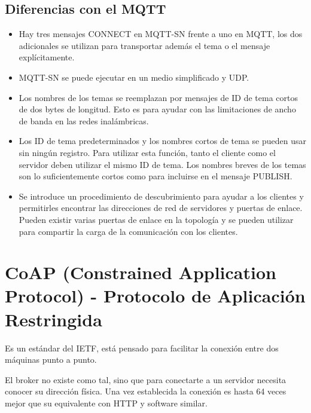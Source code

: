 \documentclass[12pt, twoside, openright]{report} %
\begin{document}
\subsection{Diferencias con el MQTT}
\begin{itemize}
	\item Hay tres mensajes CONNECT en MQTT-SN frente a uno en MQTT, los dos adicionales se utilizan para transportar además el tema o el mensaje explícitamente.
	\item MQTT-SN se puede ejecutar en un medio simplificado y UDP.
	\item Los nombres de los temas se reemplazan por mensajes de ID de tema cortos de dos bytes de longitud. Esto es para ayudar con las limitaciones de ancho de banda en las redes inalámbricas.
	\item Los ID de tema predeterminados y los nombres cortos de tema se pueden usar sin ningún registro. Para utilizar esta función, tanto el cliente como el servidor deben utilizar el mismo ID de tema. Los nombres breves de los temas son lo suficientemente cortos como para incluirse en el mensaje PUBLISH.
	\item Se introduce un procedimiento de descubrimiento para ayudar a los clientes y permitirles encontrar las direcciones de red de servidores y puertas de enlace. Pueden existir varias puertas de enlace en la topología y se pueden utilizar para compartir la carga de la comunicación con los clientes.
\end{itemize}

\section{CoAP (Constrained Application Protocol) - Protocolo de Aplicación Restringida}
Es un estándar del IETF, está pensado para facilitar la conexión entre dos máquinas punto a punto.

El broker no existe como tal, sino que para conectarte a un servidor necesita conocer su dirección física. Una vez establecida la conexión es hasta 64 veces mejor que su equivalente con HTTP y software similar.
\end{document}
